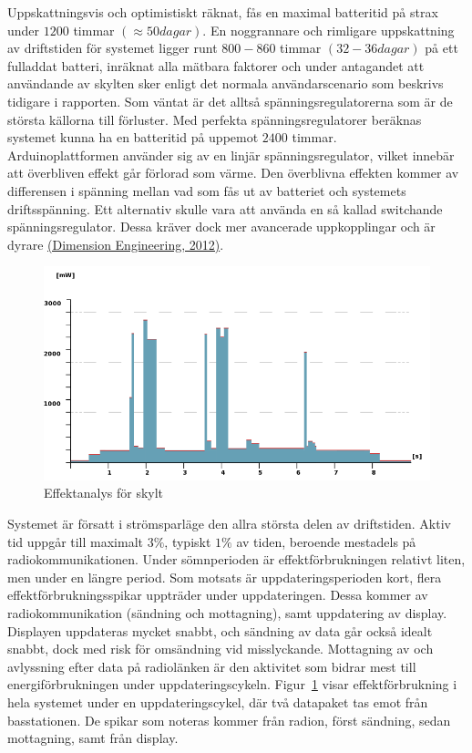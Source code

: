 \documentclass[a4paper,11pt]{article}
\begin{document}
Uppskattningsvis och optimistiskt räknat, fås en maximal batteritid på strax under $1200$ timmar $(\approx 50 dagar)$. En noggrannare och rimligare uppskattning av driftstiden för systemet ligger runt $800-860$ timmar $(32-36 dagar)$ på ett fulladdat batteri, inräknat alla mätbara faktorer och under antagandet att användande av skylten sker enligt det normala användarscenario som beskrivs tidigare i rapporten. Som väntat är det alltså spänningsregulatorerna som är de största källorna till förluster. Med perfekta spänningsregulatorer beräknas systemet kunna ha en batteritid på uppemot $2400$ timmar. \\

Arduinoplattformen använder sig av en linjär spänningsregulator, vilket innebär att överbliven effekt går förlorad som värme. Den överblivna effekten kommer av differensen i spänning mellan vad som fås ut av batteriet och systemets driftsspänning. Ett alternativ skulle vara att använda en så kallad switchande spänningsregulator. Dessa kräver dock mer avancerade uppkopplingar och är dyrare \hyperref[dimension]{(Dimension Engineering, 2012)}. \\

\begin{figure}[H]
\begin{center}
\includegraphics[scale=0.55, angle=0]{effekt.png}
\end{center}
\caption{Effektanalys för skylt}
\label{fig:effectgraph}
\end{figure}

Systemet är försatt i strömsparläge den allra största delen av driftstiden. Aktiv tid uppgår till maximalt $3\%$, typiskt $1\%$ av tiden, beroende mestadels på radiokommunikationen. Under sömnperioden är effektförbrukningen relativt liten, men under en längre period. Som motsats är uppdateringsperioden kort, flera effektförbrukningsspikar uppträder under uppdateringen. Dessa kommer av radiokommunikation (sändning och mottagning), samt uppdatering av display. Displayen uppdateras mycket snabbt, och sändning av data går också idealt snabbt, dock med risk för omsändning vid misslyckande. Mottagning av och avlyssning efter data på radiolänken är den aktivitet som bidrar mest till energiförbrukningen under uppdateringscykeln. Figur~\ref{fig:effectgraph} visar effektförbrukning i hela systemet under en uppdateringscykel, där två datapaket tas emot från basstationen. De spikar som noteras kommer från radion, först sändning, sedan mottagning, samt från display.
\end{document}
